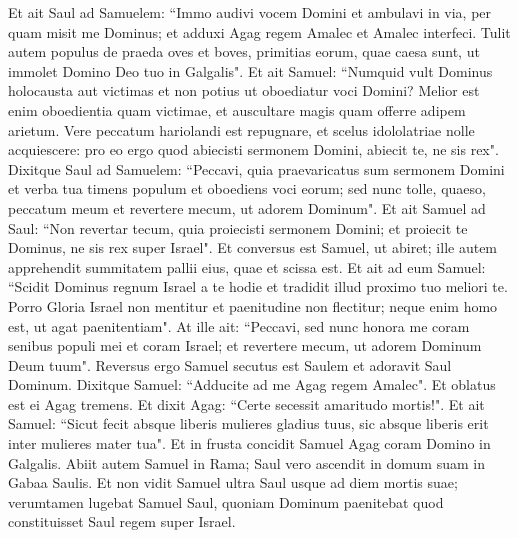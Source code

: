 \begin{biblechapter}
\verse Et ait Saul ad Samuelem: “Immo audivi vocem Domini et ambulavi in via, per quam misit me Dominus; et adduxi Agag regem Amalec et Amalec interfeci. 
\verse Tulit autem populus de praeda oves et boves, primitias eorum, quae caesa sunt, ut immolet Domino Deo tuo in Galgalis". 
\verse Et ait Samuel: “Numquid vult Dominus holocausta aut victimas et non potius ut oboediatur voci Domini? Melior est enim oboedientia quam victimae, et auscultare magis quam offerre adipem arietum. 
\verse Vere peccatum hariolandi est repugnare, et scelus idololatriae nolle acquiescere: pro eo ergo quod abiecisti sermonem Domini, abiecit te, ne sis rex". 
\verse Dixitque Saul ad Samuelem: “Peccavi, quia praevaricatus sum sermonem Domini et verba tua timens populum et oboediens voci eorum; 
\verse sed nunc tolle, quaeso, peccatum meum et revertere mecum, ut adorem Dominum". 
\verse Et ait Samuel ad Saul: “Non revertar tecum, quia proiecisti sermonem Domini; et proiecit te Dominus, ne sis rex super Israel". 
\verse Et conversus est Samuel, ut abiret; ille autem apprehendit summitatem pallii eius, quae et scissa est. 
\verse Et ait ad eum Samuel: “Scidit Dominus regnum Israel a te hodie et tradidit illud proximo tuo meliori te. 
\verse Porro Gloria Israel non mentitur et paenitudine non flectitur; neque enim homo est, ut agat paenitentiam". 
\verse At ille ait: “Peccavi, sed nunc honora me coram senibus populi mei et coram Israel; et revertere mecum, ut adorem Dominum Deum tuum". 
\verse Reversus ergo Samuel secutus est Saulem et adoravit Saul Dominum. 
\verse Dixitque Samuel: “Adducite ad me Agag regem Amalec". Et oblatus est ei Agag tremens. Et dixit Agag: “Certe secessit amaritudo mortis!". 
\verse Et ait Samuel: “Sicut fecit absque liberis mulieres gladius tuus, sic absque liberis erit inter mulieres mater tua". Et in frusta concidit Samuel Agag coram Domino in Galgalis. 
\verse Abiit autem Samuel in Rama; Saul vero ascendit in domum suam in Gabaa Saulis. 
\verse Et non vidit Samuel ultra Saul usque ad diem mortis suae; verumtamen lugebat Samuel Saul, quoniam Dominum paenitebat quod constituisset Saul regem super Israel. 
\end{biblechapter}

